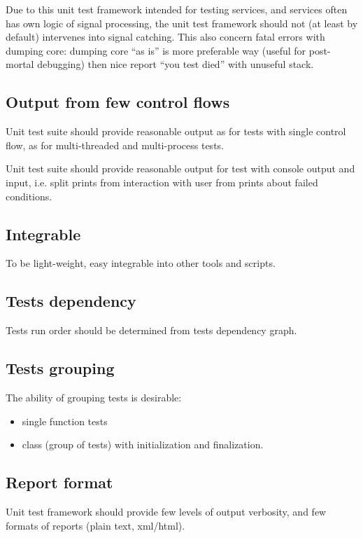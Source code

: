 \documentclass[a4paper,twoside]{article}
\begin{document}
Due to this unit test framework intended for testing services, and services
often has own logic of signal processing, the unit test framework
should not (at least by default) intervenes into signal catching.
This also concern fatal errors with dumping core: dumping core ``as is''
is more preferable way (useful for post-mortal debugging) then nice report
``you test died'' with unuseful stack.

\subsection{Output from few control flows}

Unit test suite should provide reasonable output as for tests
with single control flow, as for multi-threaded and multi-process tests.

Unit test suite should provide reasonable output for test
with console output and input, i.e. split prints from interaction with user
from prints about failed conditions.

\subsection{Integrable}

To be light-weight, easy integrable into other tools and scripts.

\subsection{Tests dependency\label{TestDependency}}

Tests run order should be determined from tests dependency graph.

\subsection{Tests grouping}

The ability of grouping tests is desirable:
\begin{itemize}
  \item single function tests
  \item class (group of tests) with initialization and finalization.
\end{itemize}

\subsection{Report format}

Unit test framework should provide few levels of output verbosity, and
few formats of reports (plain text, xml/html).
\end{document}
